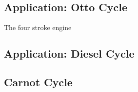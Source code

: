 \subsection{Application: Otto Cycle}
The four stroke engine


\subsection{Application: Diesel Cycle}


\subsection{Carnot Cycle}
%  
